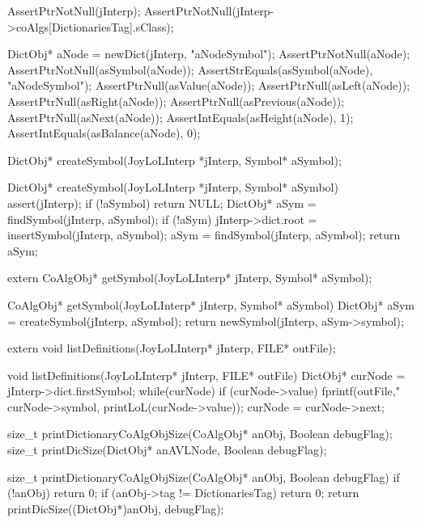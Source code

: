 
\startCTest
  AssertPtrNotNull(jInterp);
  AssertPtrNotNull(jInterp->coAlgs[DictionariesTag].sClass);

  DictObj* aNode = newDict(jInterp, "aNodeSymbol");
  AssertPtrNotNull(aNode);
  AssertPtrNotNull(asSymbol(aNode));
  AssertStrEquals(asSymbol(aNode), "aNodeSymbol");
  AssertPtrNull(asValue(aNode));
  AssertPtrNull(asLeft(aNode));
  AssertPtrNull(asRight(aNode));
  AssertPtrNull(asPrevious(aNode));
  AssertPtrNull(asNext(aNode));
  AssertIntEquals(asHeight(aNode), 1);
  AssertIntEquals(asBalance(aNode), 0);
\stopCTest
\stopTestCase
\stopTestSuite

\startTestSuite[createSymbol]

\startCHeader
DictObj* createSymbol(JoyLoLInterp *jInterp, Symbol* aSymbol);
\stopCHeader

\startCCode
DictObj* createSymbol(JoyLoLInterp *jInterp, Symbol* aSymbol) {
  assert(jInterp);
  if (!aSymbol) return NULL;
  DictObj* aSym = findSymbol(jInterp, aSymbol);
  if (!aSym) {
    jInterp->dict.root = insertSymbol(jInterp, aSymbol);
    aSym = findSymbol(jInterp, aSymbol);
  }
  return aSym;
}
\stopCCode
\stopTestSuite

\startCHeader
extern CoAlgObj* getSymbol(JoyLoLInterp* jInterp,
                           Symbol* aSymbol);
\stopCHeader

\startCCode
CoAlgObj* getSymbol(JoyLoLInterp* jInterp,
                    Symbol* aSymbol) {
  DictObj* aSym = createSymbol(jInterp, aSymbol);
  return newSymbol(jInterp, aSym->symbol);
}
\stopCCode

\startCHeader
extern void listDefinitions(JoyLoLInterp* jInterp, FILE* outFile);
\stopCHeader

\startCCode
void listDefinitions(JoyLoLInterp* jInterp, FILE* outFile) {
  DictObj* curNode = jInterp->dict.firstSymbol;
  while(curNode) {
    if (curNode->value) {
      fprintf(outFile,"%
              curNode->symbol, printLoL(curNode->value));
    }
    curNode = curNode->next;
  }
}
\stopCCode

\startCHeader
size_t printDictionaryCoAlgObjSize(CoAlgObj* anObj, Boolean debugFlag);
size_t printDicSize(DictObj* anAVLNode, Boolean debugFlag);
\stopCHeader

\startCCode
size_t printDictionaryCoAlgObjSize(CoAlgObj* anObj, Boolean debugFlag) {
  if (!anObj) return 0;
  if (anObj->tag != DictionariesTag) return 0;
  return printDicSize((DictObj*)anObj, debugFlag);
}

